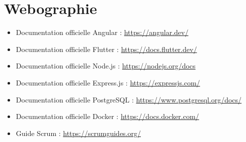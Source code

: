 \chapter*{Webographie}

\begin{itemize}
    \item Documentation officielle Angular : \url{https://angular.dev/}
    \item Documentation officielle Flutter : \url{https://docs.flutter.dev/}
    \item Documentation officielle Node.js : \url{https://nodejs.org/docs}
    \item Documentation officielle Express.js : \url{https://expressjs.com/}
    \item Documentation officielle PostgreSQL : \url{https://www.postgresql.org/docs/}
    \item Documentation officielle Docker : \url{https://docs.docker.com/}
    \item Guide Scrum : \url{https://scrumguides.org/}
\end{itemize}
